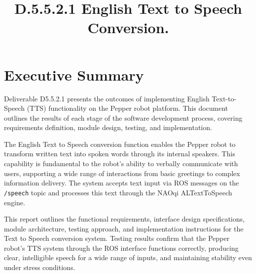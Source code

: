 \documentclass{CSSRforAfrica}
\begin{document}



\title{D.5.5.2.1 English Text to Speech Conversion.}   

\partner{}                                %




\maketitle
 

\section*{Executive Summary}
Deliverable D5.5.2.1 presents the outcomes of implementing English Text-to-Speech (TTS) functionality on the Pepper robot platform. This document outlines the results of each stage of the software development process, covering requirements definition, module design, testing, and implementation.

The English Text to Speech conversion function enables the Pepper robot to transform written text into spoken words through its internal speakers. This capability is fundamental to the robot's ability to verbally communicate with users, supporting a wide range of interactions from basic greetings to complex information delivery\cite{Bartnecketal2020}. The system accepts text input via ROS messages on the \texttt{/speech} topic and processes this text through the NAOqi ALTextToSpeech engine.

This report outlines the functional requirements, interface design specifications, module architecture, testing approach, and implementation instructions for the Text to Speech conversion system. Testing results confirm that the Pepper robot's TTS system through the ROS interface functions correctly, producing clear, intelligible speech for a wide range of inputs, and maintaining stability even under stress conditions.
\end{document}
